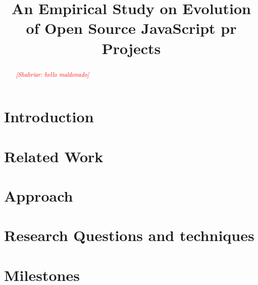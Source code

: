 \documentclass[conference]{IEEEtran}
\newcommand{\shahriar}[1]{\textcolor{red}{{\it [Shahriar: #1]}}}
\begin{document}
\title{An Empirical Study on Evolution of Open Source JavaScript pr Projects}

\author{
	
	}

\maketitle

\begin{abstract}
	\shahriar{hello maldonado}
\end{abstract}
	
\section{Introduction}
\label{sec:introduction}


\section{Related Work}
\label{sec:related_work}


\section{Approach}
\label{sec:approach}

	
\section{Research Questions and techniques}
\label{sec:rq}


\section{Milestones}
\label{milestones}

	


\end{document}

